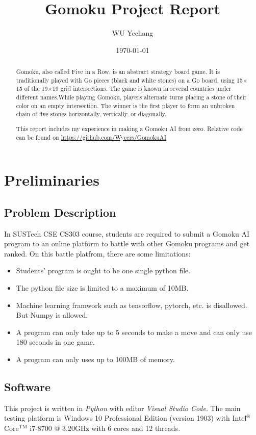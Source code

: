 \documentclass[lang=en,12pt]{elegantpaper}
\title{Gomoku Project Report}
\author{WU Yechang}
\institute{11711918}
\date{\today}
\begin{document}
\maketitle

\begin{abstract}
Gomoku, also called Five in a Row, is an abstract strategy board game.
It is traditionally played with Go pieces (black and white stones) on a Go board, using 15$\times$15 of the 19$\times$19 grid intersections.
The game is known in several countries under different names.While playing Gomoku, players alternate turns placing a stone of their color on an empty intersection. The winner is the first player to form an unbroken chain of five stones horizontally, vertically, or diagonally.

This report includes my experience in making a Gomoku AI from zero. Relative code can be found on \href{https://github.com/Wycers/GomokuAI}{https://github.com/Wycers/GomokuAI}
\end{abstract}


\section{Preliminaries}
\subsection{Problem Description}
In SUSTech CSE CS303 course, students are required to submit a Gomoku AI program to an online platform to battle with other Gomoku programs and get ranked.
On this battle platfrom, there are some limitations:
\begin{itemize}
  \item Students' program is ought to be one single python file.
  \item The python file size is limited to a maximum of 10MB.
  \item Machine learning framwork such as tensorflow, pytorch, etc. is disallowed. But Numpy is allowed.
  \item A program can only take up to 5 seconds to make a move and can only use 180 seconds in one game.
  \item A program can only uses up to 100MB of memory.
\end{itemize}

\subsection{Software}
This project is written in \textsl{Python} with editor \textsl{Visual Studio Code}.
The main testing platform is Windows 10 Professional Edition (version 1903) with Intel$^\circledR$ Core$^{\text{TM}}$ i7-8700 @ 3.20GHz with 6 cores and 12 threads.
\end{document}
